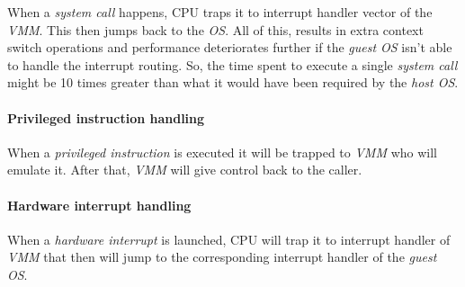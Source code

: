 \bigskip\noindent
\begin{minipage}[t]{0.48\textwidth}
    When a \emph{system call} happens, CPU traps it to interrupt handler vector
    of the \emph{VMM}. This then jumps back to the \emph{OS}. All of this,
    results in extra context switch operations and performance deteriorates
    further if the \emph{guest OS} isn't able to handle the interrupt
    routing. So, the time spent to execute a single \emph{system call} might
    be 10 times greater than what it would have been required by the \emph{host
    OS}.
\end{minipage}
\begin{minipage}[t]{0.48\textwidth}
    \centering
    \strut\vspace*{-\baselineskip}\newline
\end{minipage}

\newpage
\paragraph{Privileged instruction handling}
\mbox{}

\bigskip\noindent
\begin{minipage}[t]{0.48\textwidth}
    When a \emph{privileged instruction} is executed it will be trapped to
    \emph{VMM} who will emulate it. After that, \emph{VMM} will give control back
    to the caller.
\end{minipage}\hfill
\begin{minipage}[t]{0.48\textwidth}
    \centering
    \strut\vspace*{-\baselineskip}\newline
\end{minipage}

\paragraph{Hardware interrupt handling}
\mbox{}

\bigskip\noindent
\begin{minipage}[t]{0.48\textwidth}
    When a \emph{hardware interrupt} is launched, CPU will trap it to interrupt
    handler of \emph{VMM} that then will jump to the corresponding interrupt
    handler of the \emph{guest OS}.
\end{minipage}\hfill
\begin{minipage}[t]{0.48\textwidth}
    \centering
    \strut\vspace*{-\baselineskip}\newline
\end{minipage}

